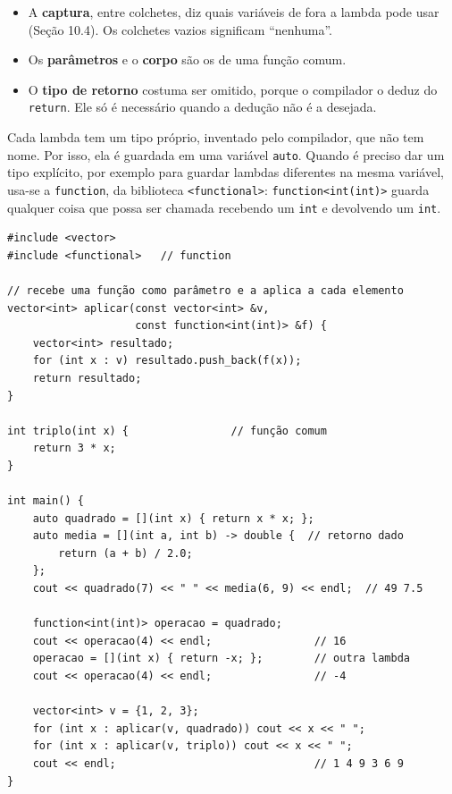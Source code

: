 \begin{itemize}
  \item A \textbf{captura}, entre colchetes, diz quais variáveis de fora a lambda pode usar (Seção 10.4). Os colchetes vazios significam ``nenhuma''.
  \item Os \textbf{parâmetros} e o \textbf{corpo} são os de uma função comum.
  \item O \textbf{tipo de retorno} costuma ser omitido, porque o compilador o deduz do \texttt{return}. Ele só é necessário quando a dedução não é a desejada.
\end{itemize}

Cada lambda tem um tipo próprio, inventado pelo compilador, que não tem nome. Por isso, ela é guardada em uma variável \texttt{auto}. Quando é preciso dar um tipo explícito, por exemplo para guardar lambdas diferentes na mesma variável, usa-se a \texttt{function}, da biblioteca \texttt{<functional>}: \texttt{function<int(int)>} guarda qualquer coisa que possa ser chamada recebendo um \texttt{int} e devolvendo um \texttt{int}.

\begin{codigo}
\begin{Verbatim}[breaklines=true, breaksymbolleft={}, fontsize=\footnotesize]
#include <vector>
#include <functional>   // function

// recebe uma função como parâmetro e a aplica a cada elemento
vector<int> aplicar(const vector<int> &v,
                    const function<int(int)> &f) {
    vector<int> resultado;
    for (int x : v) resultado.push_back(f(x));
    return resultado;
}

int triplo(int x) {                // função comum
    return 3 * x;
}

int main() {
    auto quadrado = [](int x) { return x * x; };
    auto media = [](int a, int b) -> double {  // retorno dado
        return (a + b) / 2.0;
    };
    cout << quadrado(7) << " " << media(6, 9) << endl;  // 49 7.5

    function<int(int)> operacao = quadrado;
    cout << operacao(4) << endl;                // 16
    operacao = [](int x) { return -x; };        // outra lambda
    cout << operacao(4) << endl;                // -4

    vector<int> v = {1, 2, 3};
    for (int x : aplicar(v, quadrado)) cout << x << " ";
    for (int x : aplicar(v, triplo)) cout << x << " ";
    cout << endl;                               // 1 4 9 3 6 9
}
\end{Verbatim}
\end{codigo}

